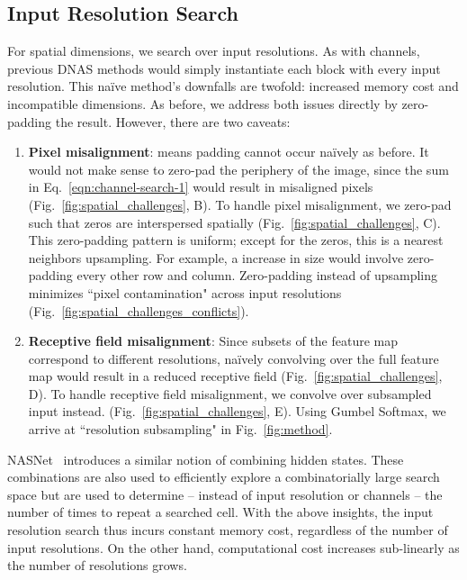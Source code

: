 \documentclass[10pt,twocolumn,letterpaper]{article}
\begin{document}
\subsection{Input Resolution Search}

For spatial dimensions, we search over input resolutions. As with channels, previous DNAS methods would simply instantiate each block with every input resolution. This naïve method's downfalls are twofold: increased memory cost and incompatible dimensions. As before, we address both issues directly by zero-padding the result. However, there are two caveats:

\begin{enumerate}
    \item \textbf{Pixel misalignment}: means padding cannot occur naïvely as before. It would not make sense to zero-pad the periphery of the image, since the sum in Eq.~\ref{eqn:channel-search-1} would result in misaligned pixels (Fig.~\ref{fig:spatial_challenges}, B). To handle pixel misalignment, we zero-pad such that zeros are interspersed spatially (Fig.~\ref{fig:spatial_challenges}, C). This zero-padding pattern is uniform; except for the zeros, this is a nearest neighbors upsampling. For example, a  increase in size would involve zero-padding every other row and column. Zero-padding instead of upsampling minimizes ``pixel contamination" across input resolutions (Fig.~\ref{fig:spatial_challenges_conflicts}).
    \item \textbf{Receptive field misalignment}: Since subsets of the feature map correspond to different resolutions, naïvely convolving over the full feature map would result in a reduced receptive field (Fig.~\ref{fig:spatial_challenges}, D). To handle receptive field misalignment, we convolve over subsampled input instead. (Fig.~\ref{fig:spatial_challenges}, E). Using Gumbel Softmax, we arrive at ``resolution subsampling" in Fig.~\ref{fig:method}.
\end{enumerate}

NASNet~\cite{nasnet} introduces a similar notion of combining hidden states. These combinations are also used to efficiently explore a combinatorially large search space but are used to determine -- instead of input resolution or channels -- the number of times to repeat a searched cell. With the above insights, the input resolution search thus incurs constant memory cost, regardless of the number of input resolutions. On the other hand, computational cost increases sub-linearly as the number of resolutions grows.
\end{document}
